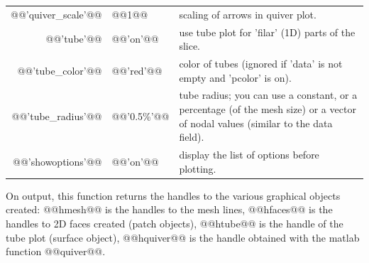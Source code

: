 \documentclass[11pt,a4paper]{article}
\newcommand{\sf}[1]{#1}
\newcommand{\mlab}{{\sf matlab}\xspace}
\begin{document}
\begin{cmddescription}
\begin{center}
\begin{tabular}{|rlp{}|}
  @@'quiver_scale'@@   & @@1@@        & scaling of arrows in quiver plot.\\
  @@'tube'@@          & @@'on'@@     & use tube plot for 'filar' (1D) parts of the slice.\\
  @@'tube_color'@@     & @@'red'@@    & color of tubes (ignored if 'data' is not empty and 'pcolor' is on).\\
  @@'tube_radius'@@    & @@'0.5\%'@@   & tube radius; you can use a constant, or a percentage (of the mesh size) or a vector of nodal values (similar to the data field).\\
  @@'showoptions'@@  & @@'on'@@      & display the list of options before plotting.\\
    \hline
  \end{tabular}
\end{center}

On output, this function returns the handles to the various
graphical objects created: @@hmesh@@ is the handles to the mesh
lines, @@hfaces@@ is the handles to 2D faces created (patch objects), @@htube@@
is the handle of the tube plot (surface object), @@hquiver@@ is the handle obtained with the \mlab function @@quiver@@.
\end{cmddescription}
\end{document}
